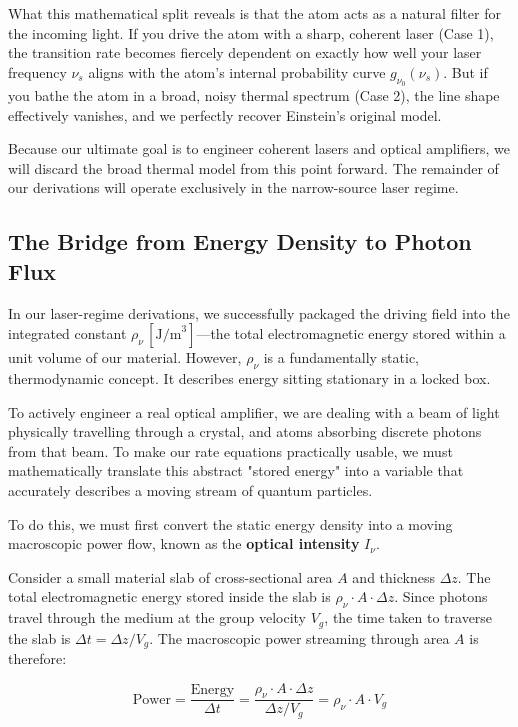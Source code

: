 What this mathematical split reveals is that the atom acts as a natural filter for the incoming light. If you drive the atom with a sharp, coherent laser (Case 1), the transition rate becomes fiercely dependent on exactly how well your laser frequency $\nu_s$ aligns with the atom's internal probability curve $g_{\nu_0}(\nu_s)$. But if you bathe the atom in a broad, noisy thermal spectrum (Case 2), the line shape effectively vanishes, and we perfectly recover Einstein's original model.

Because our ultimate goal is to engineer coherent lasers and optical amplifiers, we will discard the broad thermal model from this point forward. The remainder of our derivations will operate exclusively in the narrow-source laser regime.

\subsection{The Bridge from Energy Density to Photon Flux}

In our laser-regime derivations, we successfully packaged the driving field into the integrated constant $\rho_\nu\, [\text{J/m}^3]$—the total electromagnetic energy stored within a unit volume of our material. However, $\rho_\nu$ is a fundamentally static, thermodynamic concept. It describes energy sitting stationary in a locked box.

To actively engineer a real optical amplifier, we are dealing with a beam of light physically travelling through a crystal, and atoms absorbing discrete photons from that beam. To make our rate equations practically usable, we must mathematically translate this abstract "stored energy" into a variable that accurately describes a moving stream of quantum particles.

To do this, we must first convert the static energy density into a moving macroscopic power flow, known as the \textbf{optical intensity} $I_\nu$.

Consider a small material slab of cross-sectional area $A$ and thickness $\Delta z$. The total electromagnetic energy stored inside the slab is $\rho_\nu \cdot A \cdot \Delta z$. Since photons travel through the medium at the group velocity $V_g$, the time taken to traverse the slab is $\Delta t = \Delta z / V_g$. The macroscopic power streaming through area $A$ is therefore:

\begin{equation*}
    \text{Power} = \frac{\text{Energy}}{\Delta t} = \frac{\rho_\nu \cdot A \cdot \Delta z}{\Delta z / V_g} = \rho_\nu \cdot A \cdot V_g
\end{equation*}

